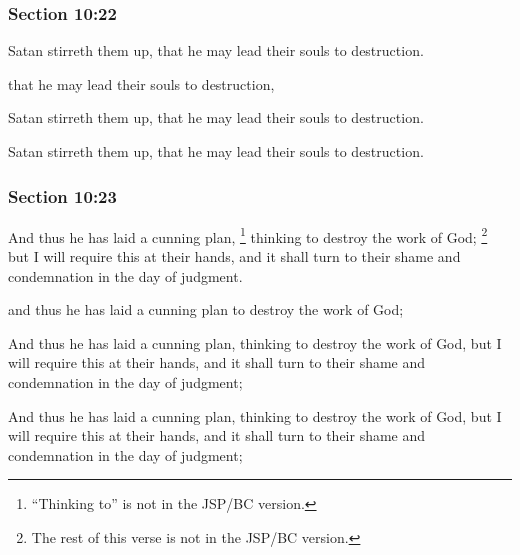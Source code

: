 	\subsubsection{Section 10:22} %
		\label{DC10-22}

		Satan stirreth them up, that he may lead their souls to destruction.

		\begin{framed}
		\scriptsize
			\begin{compactdesc}
				\item[JSP] that he may lead their souls to destruction,
				\item[RB1] [\textit{missing}] 
				\item[DC 1835] Satan stirreth them up, that he may lead their souls to destruction.
				\item[DC 1844] Satan stirreth them up, that he may lead their souls to destruction. 
			\end{compactdesc}
		\end{framed}

	\subsubsection{Section 10:23} %
		\label{DC10-23}

		And thus he has laid a cunning plan,
			\footnote{%
				``Thinking to'' is not in the JSP/BC version.
				}%
		thinking to destroy the work of God;
			\footnote{%
				The rest of this verse is not in the JSP/BC version.
				}%
		but I will require this at their hands, and it shall turn to their shame and condemnation in the day of judgment.

		\begin{framed}
		\scriptsize
			\begin{compactdesc}
				\item[JSP] and thus he has laid a cunning plan to destroy the work of God;
				\item[RB1] [\textit{missing}] 
				\item[DC 1835] And thus he has laid a cunning plan, thinking to destroy the work of God, but I will require this at their hands, and it shall turn to their shame and condemnation in the day of judgment;
				\item[DC 1844] And thus he has laid a cunning plan, thinking to destroy the work of God, but I will require this at their hands, and it shall turn to their shame and condemnation in the day of judgment;
			\end{compactdesc}
		\end{framed}

